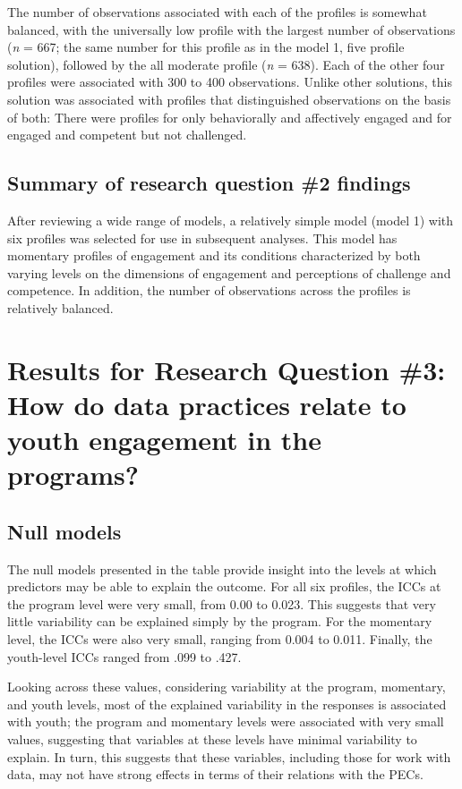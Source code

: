 \documentclass[]{msu-thesis}
\theoremstyle{definition}
\theoremstyle{definition}
\theoremstyle{definition}
\theoremstyle{remark}
\begin{document}
The number of observations associated with each of the profiles is
somewhat balanced, with the universally low profile with the largest
number of observations (\emph{n} = 667; the same number for this profile
as in the model 1, five profile solution), followed by the all moderate
profile (\emph{n} = 638). Each of the other four profiles were
associated with 300 to 400 observations. Unlike other solutions, this
solution was associated with profiles that distinguished observations on
the basis of both: There were profiles for only behaviorally and
affectively engaged and for engaged and competent but not challenged.

\subsection{Summary of research question \#2
findings}\label{summary-of-research-question-2-findings}

After reviewing a wide range of models, a relatively simple model (model
1) with six profiles was selected for use in subsequent analyses. This
model has momentary profiles of engagement and its conditions
characterized by both varying levels on the dimensions of engagement and
perceptions of challenge and competence. In addition, the number of
observations across the profiles is relatively balanced.

\section{Results for Research Question \#3: How do data practices relate
to youth engagement in the
programs?}\label{results-for-research-question-3-how-do-data-practices-relate-to-youth-engagement-in-the-programs}

\subsection{Null models}\label{null-models}

The null models presented in the table provide insight into the levels
at which predictors may be able to explain the outcome. For all six
profiles, the ICCs at the program level were very small, from 0.00 to
0.023. This suggests that very little variability can be explained
simply by the program. For the momentary level, the ICCs were also very
small, ranging from 0.004 to 0.011. Finally, the youth-level ICCs ranged
from .099 to .427.

Looking across these values, considering variability at the program,
momentary, and youth levels, most of the explained variability in the
responses is associated with youth; the program and momentary levels
were associated with very small values, suggesting that variables at
these levels have minimal variability to explain. In turn, this suggests
that these variables, including those for work with data, may not have
strong effects in terms of their relations with the PECs.
\end{document}
